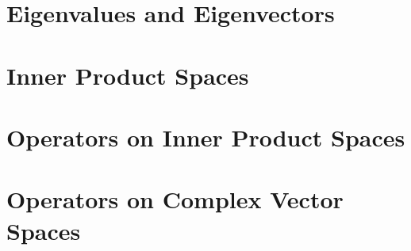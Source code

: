 \documentclass[11pt]{report}
\begin{document}
  \chapter{Eigenvalues and Eigenvectors}
  
   \clearpage

  
   \clearpage

  
   \clearpage

  
   \clearpage

  
   \clearpage

  \chapter{Inner Product Spaces}
  
   \clearpage
  
   \clearpage
  
   \clearpage

  \chapter{Operators on Inner Product Spaces}
  
   \clearpage
  
   \clearpage
  
   \clearpage
  
   \clearpage
  
   \clearpage
  
   \clearpage

  \chapter{Operators on Complex Vector Spaces}
  
   \clearpage
\end{document}
